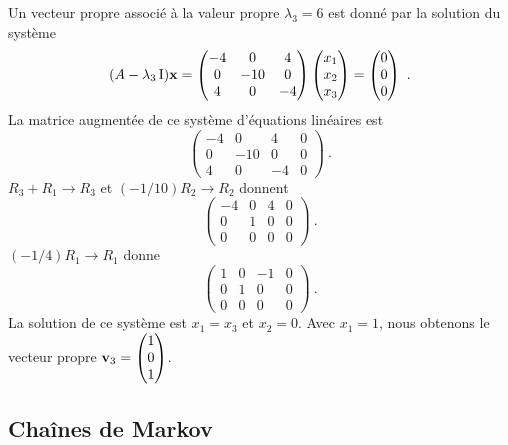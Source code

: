 {Un vecteur propre
associé à la valeur propre $\lambda_3 = 6$ est donné par la solution
du système
\[
(A-\lambda_3\operatorname{I})\mathbf{x} = 
\begin{pmatrix}
-4 & 0 & 4 \\0 & -10 & 0 \\4 & 0 & -4
\end{pmatrix}
\begin{pmatrix} x_1 \\ x_2 \\ x_3 \end{pmatrix}
= \begin{pmatrix} 0 \\ 0 \\ 0 \end{pmatrix} \ .
\]
La matrice augmentée de ce système d'équations linéaires est
\[
\left(\begin{array}{ccc|c}
-4 & 0 & 4 & 0 \\0 & -10 & 0 & 0 \\4 & 0 & -4 & 0 
\end{array}\right) \ .
\]
$R_3+R_1 \rightarrow R_3$ et $(-1/10)R_2 \rightarrow R_2$ donnent
\[
\left(\begin{array}{ccc|c}
-4 & 0 & 4 & 0 \\ 0 & 1 & 0 & 0 \\ 0 & 0 & 0 & 0
\end{array}\right) \ .
\]
$(-1/4)R_1 \rightarrow R_1$ donne
\[
\left(\begin{array}{ccc|c}
1 & 0 & -1 & 0 \\ 0 & 1 & 0 & 0 \\ 0 & 0 & 0 & 0
\end{array}\right) \ .
\]
La solution de ce système est $x_1=x_3$ et $x_2=0$.  Avec $x_1=1$,
nous obtenons le vecteur propre
$\displaystyle \mathbf{v}_3 = \begin{pmatrix} 1 \\ 0 \\ 1 \end{pmatrix}$.
}

\subsection{Chaînes de Markov}

